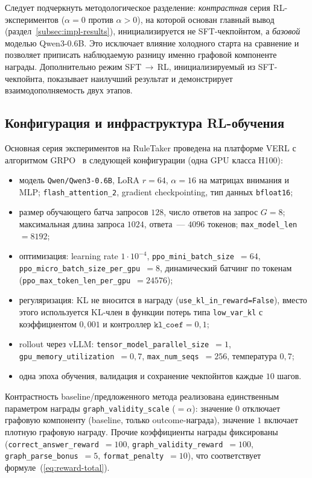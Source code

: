 Следует подчеркнуть методологическое разделение: \emph{контрастная} серия RL-экспериментов ($\alpha = 0$ против $\alpha > 0$), на которой основан главный вывод (раздел~\ref{subsec:impl-results}), инициализируется не SFT-чекпойнтом, а \emph{базовой} моделью Qwen3-0.6B. Это исключает влияние холодного старта на сравнение и позволяет приписать наблюдаемую разницу именно графовой компоненте награды. Дополнительно режим SFT\,$\to$\,RL, инициализируемый из SFT-чекпойнта, показывает наилучший результат и демонстрирует взаимодополняемость двух этапов.

\subsection{Конфигурация и инфраструктура RL-обучения}
\label{subsec:impl-rl-config}

Основная серия экспериментов на RuleTaker проведена на платформе VERL с алгоритмом GRPO~\cite{shao2024deepseekmath} в следующей конфигурации (одна GPU класса H100):
\begin{itemize}
    \setlength{\itemsep}{\smallskipamount}
    \item модель \texttt{Qwen/Qwen3-0.6B}, LoRA $r=64$, $\alpha=16$ на матрицах внимания и MLP; \texttt{flash\_attention\_2}, gradient checkpointing, тип данных \texttt{bfloat16};
    \item размер обучающего батча запросов $128$, число ответов на запрос $G=8$; максимальная длина запроса $1024$, ответа~--- $4096$ токенов; \texttt{max\_model\_len}~$=8192$;
    \item оптимизация: learning rate $1\cdot 10^{-4}$, \texttt{ppo\_mini\_batch\_size}~$=64$, \texttt{ppo\_micro\_batch\_size\_per\_gpu}~$=8$, динамический батчинг по токенам (\texttt{ppo\_max\_token\_len\_per\_gpu}~$=24576$);
    \item регуляризация: KL не вносится в награду (\texttt{use\_kl\_in\_reward=False}), вместо этого используется KL-член в функции потерь типа \texttt{low\_var\_kl} с коэффициентом $0{,}001$ и контроллер $\texttt{kl\_coef}=0{,}1$;
    \item rollout через vLLM: \texttt{tensor\_model\_parallel\_size}~$=1$, \texttt{gpu\_memory\_utili\-zation}~$=0{,}7$, \texttt{max\_num\_seqs}~$=256$, температура $0{,}7$;
    \item одна эпоха обучения, валидация и сохранение чекпойнтов каждые $10$ шагов.
\end{itemize}

Контрастность baseline/предложенного метода реализована единственным параметром награды \texttt{graph\_validity\_scale} ($=\alpha$): значение $0$ отключает графовую компоненту (baseline, только outcome-награда), значение $1$ включает плотную графовую награду. Прочие коэффициенты награды фиксированы (\texttt{correct\_answer\_reward}~$=100$, \texttt{graph\_validity\_reward}~$=100$, \texttt{graph\_parse\_bonus}~$=5$, \texttt{format\_penalty}~$=10$), что соответствует формуле~(\ref{eq:reward-total}).

